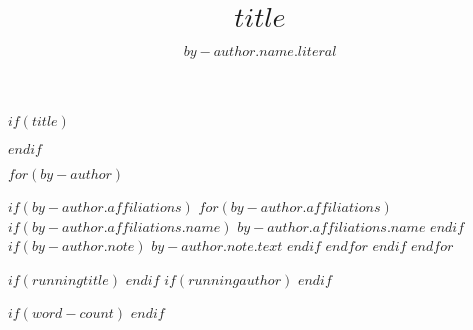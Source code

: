 $if(title)$
\title{$title$}
$endif$

$for(by-author)$
  \author{$by-author.name.literal$}{%
  $if(by-author.affiliations)$
    $for(by-author.affiliations)$
      $if(by-author.affiliations.name)$
         $by-author.affiliations.name$
      $endif$
  }{%
      $if(by-author.note)$
          $by-author.note.text$
      $endif$
  }
    $endfor$
  $endif$
$endfor$

$if(runningtitle)$
$endif$
$if(runningauthor)$
$endif$ 

$if(word-count)$
$endif$